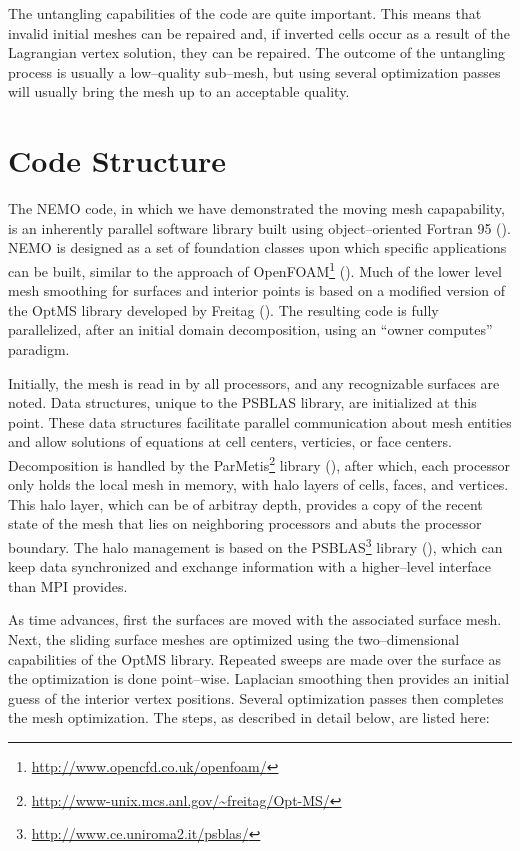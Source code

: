 \documentclass[a4paper,12pt,notitlepage]{article}
\begin{document}
The untangling capabilities of the code are quite important.  This
means that invalid initial meshes can be repaired and, if inverted
cells occur as a result of the Lagrangian vertex solution, they can be
repaired.  The outcome of the untangling process is usually a
low--quality sub--mesh, but using several optimization passes will
usually bring the mesh up to an acceptable quality.

\section{Code Structure}
The NEMO code, in which we have demonstrated the moving mesh
capapability, is an inherently parallel software library built using
object--oriented Fortran 95 (\cite{toninel:phd}).  NEMO is designed as
a set of foundation classes upon which specific applications can be
built, similar to the approach of
OpenFOAM\footnote{\url{http://www.opencfd.co.uk/openfoam/}}
(\cite{weller:foam}).  Much of the lower level mesh smoothing for
surfaces and interior points is based on a modified version of the OptMS library developed
by Freitag (\cite{optms:manual}).  The resulting code is fully parallelized,
after an initial domain decomposition, using an ``owner computes''
paradigm.

Initially, the mesh is read in by all processors, and any recognizable
surfaces are noted.  Data structures, unique to the PSBLAS library,
are initialized at this point.  These data structures facilitate
parallel communication about mesh entities and allow solutions of
equations at cell centers, verticies, or face centers.  Decomposition
is handled by the ParMetis\footnote{
  \url{http://www-unix.mcs.anl.gov/~freitag/Opt-MS/}} library
(\cite{parmetis}), after which, each processor only holds the local
mesh in memory, with halo layers of cells, faces, and vertices.  This
halo layer, which can be of arbitray depth, provides a copy of the
recent state of the mesh that lies on neighboring processors and abuts
the processor boundary.  The halo management is based on the
PSBLAS\footnote{\url{http://www.ce.uniroma2.it/psblas/}} library
(\cite{filippone:psblas,buttari:phd}), which can keep data
synchronized and exchange information with a higher--level interface
than MPI provides.

As time advances, first the surfaces are moved with the associated
surface mesh.  Next, the sliding surface meshes are optimized using
the two--dimensional capabilities of the OptMS library.  Repeated
sweeps are made over the surface as the optimization is done
point--wise.  Laplacian smoothing then provides an initial guess of the interior vertex positions.  Several optimization passes then completes the mesh optimization.  The steps, as described in detail below, are listed here:
\end{document}
